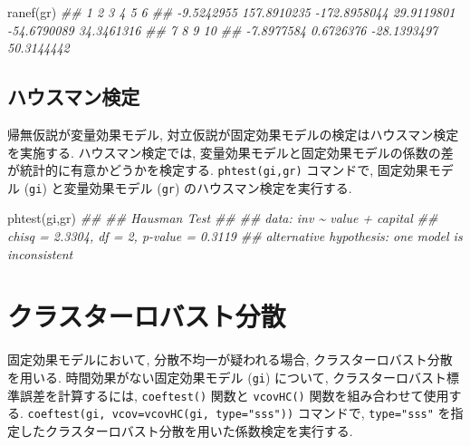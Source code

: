 \documentclass[
  letterpaper,
  xelatex,
  ja=standard, xelatex]{bxjsbook}
\newenvironment{Shaded}{\begin{snugshade}}{\end{snugshade}}
\newcommand{\DocumentationTok}[1]{\textcolor[rgb]{0.37,0.37,0.37}{\textit{#1}}}
\newcommand{\FunctionTok}[1]{\textcolor[rgb]{0.28,0.35,0.67}{#1}}
\newcommand{\NormalTok}[1]{\textcolor[rgb]{0.00,0.23,0.31}{#1}}
\begin{document}
\begin{Shaded}
\begin{Highlighting}[]
\FunctionTok{ranef}\NormalTok{(gr)}
\DocumentationTok{\#\#            1            2            3            4            5            6 }
\DocumentationTok{\#\#   {-}9.5242955  157.8910235 {-}172.8958044   29.9119801  {-}54.6790089   34.3461316 }
\DocumentationTok{\#\#            7            8            9           10 }
\DocumentationTok{\#\#   {-}7.8977584    0.6726376  {-}28.1393497   50.3144442}
\end{Highlighting}
\end{Shaded}

\subsection{ハウスマン検定}\label{ux30cfux30a6ux30b9ux30deux30f3ux691cux5b9a}

帰無仮説が変量効果モデル,
対立仮説が固定効果モデルの検定はハウスマン検定を実施する.
ハウスマン検定では,
変量効果モデルと固定効果モデルの係数の差が統計的に有意かどうかを検定する.
\texttt{phtest(gi,gr)} コマンドで, 固定効果モデル (\texttt{gi})
と変量効果モデル (\texttt{gr}) のハウスマン検定を実行する.

\begin{Shaded}
\begin{Highlighting}[]
\FunctionTok{phtest}\NormalTok{(gi,gr)}
\DocumentationTok{\#\# }
\DocumentationTok{\#\#  Hausman Test}
\DocumentationTok{\#\# }
\DocumentationTok{\#\# data:  inv \textasciitilde{} value + capital}
\DocumentationTok{\#\# chisq = 2.3304, df = 2, p{-}value = 0.3119}
\DocumentationTok{\#\# alternative hypothesis: one model is inconsistent}
\end{Highlighting}
\end{Shaded}

\section{クラスターロバスト分散}\label{ux30afux30e9ux30b9ux30bfux30fcux30edux30d0ux30b9ux30c8ux5206ux6563}

固定効果モデルにおいて, 分散不均一が疑われる場合,
クラスターロバスト分散を用いる. 時間効果がない固定効果モデル
(\texttt{gi}) について, クラスターロバスト標準誤差を計算するには,
\texttt{coeftest()} 関数と \texttt{vcovHC()} 関数を組み合わせて使用する.
\texttt{coeftest(gi,\ vcov=vcovHC(gi,\ type="sss"))} コマンドで,
\texttt{type="sss"}
を指定したクラスターロバスト分散を用いた係数検定を実行する.
\end{document}
